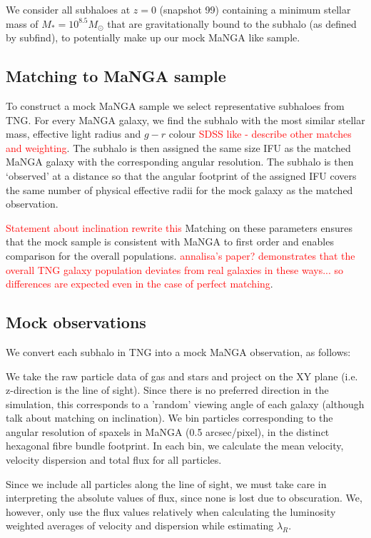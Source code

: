 \documentclass[fleqn,usenatbib]{mnras}
\newcommand{\red}[1]{{\textcolor{red}{#1}}}
\begin{document}
We consider all subhaloes at $z=0$ (snapshot 99) containing a minimum stellar mass of $M_{\ast} = 10^{8.5} M_{\odot}$ that are gravitationally bound to the subhalo (as defined by subfind), to potentially make up our mock MaNGA like sample. 

\subsection{Matching to MaNGA sample}
To construct a mock MaNGA sample we select representative subhaloes from TNG. For every MaNGA galaxy, we find the subhalo with the most similar stellar mass, effective light radius and $g - r$ colour \red{SDSS like - describe other matches and weighting}. The subhalo is then assigned the same size IFU as the matched MaNGA galaxy with the corresponding angular resolution. The subhalo is then `observed' at a distance so that the angular footprint of the assigned IFU covers the same number of physical effective radii for the mock galaxy as the matched observation. 

\red{Statement about inclination}
\red{rewrite this} Matching on these parameters ensures that the mock sample is consistent with MaNGA to first order and enables comparison for the overall populations. \red{annalisa's paper? demonstrates that the overall TNG galaxy population deviates from real galaxies in these ways... so differences are expected even in the case of perfect matching}. 

\subsection{Mock observations}
We convert each subhalo in TNG into a mock MaNGA observation, as follows:

We take the raw particle data of gas and stars and project on the XY plane (i.e. z-direction is the line of sight). Since there is no preferred direction in the simulation, this corresponds to a 'random' viewing angle of each galaxy (although talk about matching on inclination). We bin particles corresponding to the angular resolution of spaxels in MaNGA (0.5 arcsec/pixel), in the distinct hexagonal fibre bundle footprint. In each bin, we calculate the mean velocity, velocity dispersion and total flux for all particles.

Since we include all particles along the line of sight, we must take care in interpreting the absolute values of flux, since none is lost due to obscuration. We, however, only use the flux values relatively when calculating the luminosity weighted averages of velocity and dispersion while estimating $\lambda_R$. 
\end{document}

